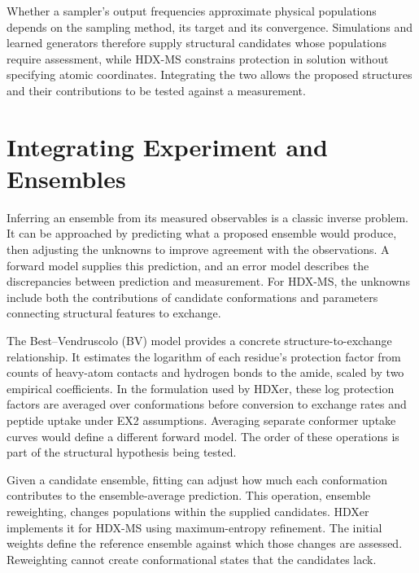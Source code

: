 Whether a sampler's output frequencies approximate physical populations depends on the sampling method, its target and its convergence.\supercite{bmsb2012ch4} Simulations and learned generators therefore supply structural candidates whose populations require assessment, while HDX-MS constrains protection in solution without specifying atomic coordinates. Integrating the two allows the proposed structures and their contributions to be tested against a measurement.

\section{Integrating Experiment and Ensembles}
\label{sec:intro-integration}

Inferring an ensemble from its measured observables is a classic inverse problem. It can be approached by predicting what a proposed ensemble would produce, then adjusting the unknowns to improve agreement with the observations. A forward model supplies this prediction, and an error model describes the discrepancies between prediction and measurement.\supercite{bmsb2012ch12} For HDX-MS, the unknowns include both the contributions of candidate conformations and parameters connecting structural features to exchange.

The Best--Vendruscolo (BV) model provides a concrete structure-to-exchange relationship. It estimates the logarithm of each residue's protection factor from counts of heavy-atom contacts and hydrogen bonds to the amide, scaled by two empirical coefficients.\supercite{bestStructuralInterpretationHydrogen2006} In the formulation used by HDXer, these log protection factors are averaged over conformations before conversion to exchange rates and peptide uptake under EX2 assumptions.\supercite{bradshawInterpretationHDXData2020} Averaging separate conformer uptake curves would define a different forward model. The order of these operations is part of the structural hypothesis being tested.

Given a candidate ensemble, fitting can adjust how much each conformation contributes to the ensemble-average prediction. This operation, ensemble reweighting, changes populations within the supplied candidates. HDXer implements it for HDX-MS using maximum-entropy refinement.\supercite{leeInterpretingHydrogenDeuteriumExchange2021} The initial weights define the reference ensemble against which those changes are assessed. Reweighting cannot create conformational states that the candidates lack.

